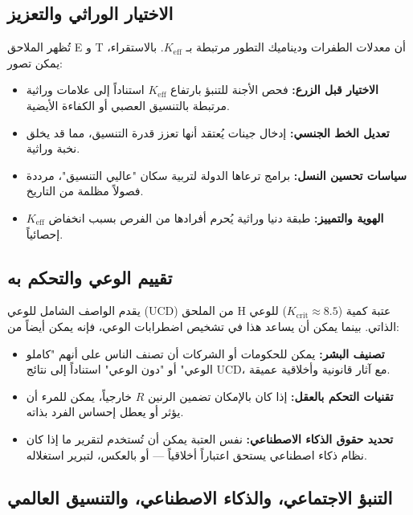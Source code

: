 \documentclass[12pt,a4paper]{article}
\theoremstyle{remark}
\newcommand{\Keff}{K_{\mathrm{eff}}}
\newcommand{\Kcrit}{K_{\mathrm{crit}}}
\begin{document}
	\subsection{الاختيار الوراثي والتعزيز}
	\label{subsec:genetic}
	
	تُظهر الملاحق E و T أن معدلات الطفرات وديناميك التطور مرتبطة بـ \(\Keff\). بالاستقراء، يمكن تصور:
	\begin{itemize}[leftmargin=*]
		\item \textbf{الاختيار قبل الزرع:} فحص الأجنة للتنبؤ بارتفاع \(\Keff\) استناداً إلى علامات وراثية مرتبطة بالتنسيق العصبي أو الكفاءة الأيضية.
		\item \textbf{تعديل الخط الجنسي:} إدخال جينات يُعتقد أنها تعزز قدرة التنسيق، مما قد يخلق نخبة وراثية.
		\item \textbf{سياسات تحسين النسل:} برامج ترعاها الدولة لتربية سكان "عاليي التنسيق"، مرددة فصولاً مظلمة من التاريخ.
		\item \textbf{الهوية والتمييز:} طبقة دنيا وراثية يُحرم أفرادها من الفرص بسبب انخفاض \(\Keff\) إحصائياً.
	\end{itemize}
	
	\subsection{تقييم الوعي والتحكم به}
	\label{subsec:consciousness}
	
	يقدم الواصف الشامل للوعي (UCD) من الملحق H عتبة كمية (\(\Kcrit \approx 8.5\)) للوعي الذاتي. بينما يمكن أن يساعد هذا في تشخيص اضطرابات الوعي، فإنه يمكن أيضاً من:
	\begin{itemize}[leftmargin=*]
		\item \textbf{تصنيف البشر:} يمكن للحكومات أو الشركات أن تصنف الناس على أنهم "كاملو الوعي" أو "دون الوعي" استناداً إلى نتائج UCD، مع آثار قانونية وأخلاقية عميقة.
		\item \textbf{تقنيات التحكم بالعقل:} إذا كان بالإمكان تضمين الرنين \(R\) خارجياً، يمكن للمرء أن يؤثر أو يعطل إحساس الفرد بذاته.
		\item \textbf{تحديد حقوق الذكاء الاصطناعي:} نفس العتبة يمكن أن تُستخدم لتقرير ما إذا كان نظام ذكاء اصطناعي يستحق اعتباراً أخلاقياً — أو بالعكس، لتبرير استغلاله.
	\end{itemize}
	
	\subsection{التنبؤ الاجتماعي، والذكاء الاصطناعي، والتنسيق العالمي}
	\label{subsec:social}
	
\end{document}

